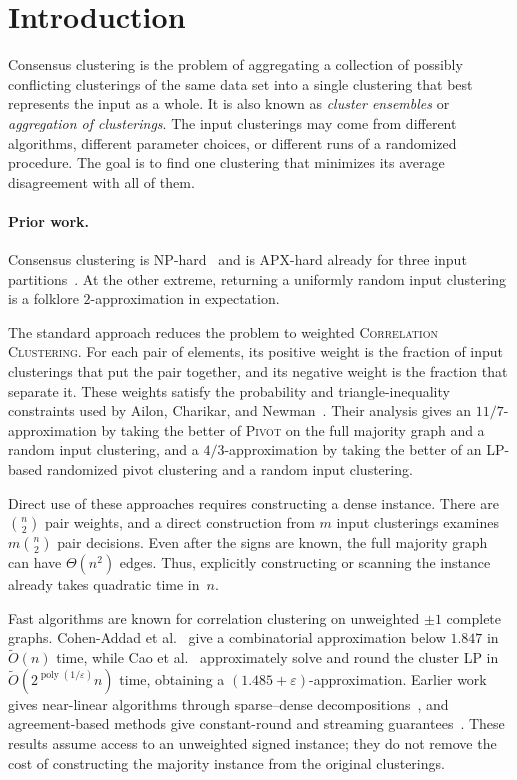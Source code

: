 \documentclass[11pt,letterpaper]{article}
\theoremstyle{definition}
\theoremstyle{remark}
\newcommand{\1}{\mathbf{1}}
\newcommand{\Pivot}{\textnormal{\textsc{Pivot}}}
\begin{document}
\hypersetup{pageanchor=true}

\section{Introduction}
\label{sec:intro}

Consensus clustering is the problem of aggregating a collection of possibly conflicting clusterings of the same data set into a single clustering that best represents the input as a whole.  It is also known as \emph{cluster ensembles} or \emph{aggregation of clusterings}.  The input clusterings may come from different algorithms, different parameter choices, or different runs of a randomized procedure.  The goal is to find one clustering that minimizes its average disagreement with all of them.

\paragraph{Prior work.}
Consensus clustering is NP-hard~\cite{filkov-skiena} and is APX-hard already for three input partitions~\cite{bonizzoni}.  At the other extreme, returning a uniformly random input clustering is a folklore $2$-approximation in expectation.

The standard approach reduces the problem to weighted \textsc{Correlation Clustering}.  For each pair of elements, its positive weight is the fraction of input clusterings that put the pair together, and its negative weight is the fraction that separate it.  These weights satisfy the probability and triangle-inequality constraints used by Ailon, Charikar, and Newman~\cite{acn}.  Their analysis gives an $11/7$-approximation by taking the better of \Pivot{} on the full majority graph and a random input clustering, and a $4/3$-approximation by taking the better of an LP-based randomized pivot clustering and a random input clustering.

Direct use of these approaches requires constructing a dense instance.  There are $\binom n2$ pair weights, and a direct construction from $m$ input clusterings examines $m\binom n2$ pair decisions.  Even after the signs are known, the full majority graph can have $\Theta(n^2)$ edges.  Thus, explicitly constructing or scanning the instance already takes quadratic time in~$n$.

Fast algorithms are known for correlation clustering on unweighted $\pm1$ complete graphs.  Cohen-Addad et al.~\cite{cohen-addad-2024} give a combinatorial approximation below $1.847$ in $\widetilde O(n)$ time, while Cao et al.~\cite{cohen-addad-2025} approximately solve and round the cluster LP in $\widetilde O(2^{\operatorname{poly}(1/\varepsilon)}n)$ time, obtaining a $(1.485+\varepsilon)$-approximation.  Earlier work gives near-linear algorithms through sparse--dense decompositions~\cite{assadi-wang}, and agreement-based methods give constant-round and streaming guarantees~\cite{CLMNPT2021}.  These results assume access to an unweighted signed instance; they do not remove the cost of constructing the majority instance from the original clusterings.
\end{document}
